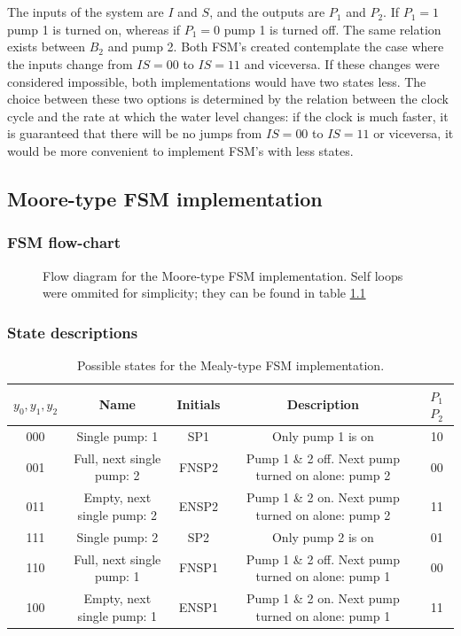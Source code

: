 \documentclass[../../e3_tp3_main.tex]{subfiles}
\begin{document}
\chapter{}

The inputs of the system are $I$ and $S$, and the outputs are $P_1$ and $P_2$. If $P_1=1$ pump 1 is turned on, whereas if $P_1=0$ pump 1 is turned off. The same relation exists between $B_2$ and pump 2. Both FSM's created contemplate the case where the inputs change from $IS=00$ to $IS=11$ and viceversa. If these changes were considered impossible, both implementations would have two states less. The choice between these two options is determined by the relation between the clock cycle and the rate at which the water level changes: if the clock is much faster, it is guaranteed that there will be no jumps from $IS=00$ to $IS=11$ or viceversa, it would be more convenient to implement FSM's with less states.

\section{Moore-type FSM implementation}
\subsection{FSM flow-chart}
\begin{figure}[H]
	\centering
	
	\caption{Flow diagram for the Moore-type FSM implementation. Self loops were ommited for simplicity; they can be found in table \ref{tab:ej1_moore_states}}
\end{figure}

\subsection{State descriptions}
\begin{table}[H]	%
	\centering
	\begin{tabular}{|c|c|c|c|c|}
	\hline	
	$y_0, y_1, y_2$ & Name & Initials & Description & $P_1$ $P_2$\\	
	\hline 
	000 & Single pump: 1 &SP1& Only pump 1 is on & 10\\ 
	\hline 
	001 & Full, next single pump: 2 &FNSP2 & Pump 1 \& 2 off. Next pump turned on alone: pump 2& 00\\ 
	\hline	
	011 & Empty, next single pump: 2 &ENSP2 & Pump 1 \& 2 on. Next pump turned on alone: pump 2 & 11\\ 
	\hline 
	111 & Single pump: 2 & SP2 & Only pump 2 is on & 01\\ 
	\hline 
	110 & Full, next single pump: 1 &FNSP1& Pump 1 \& 2 off. Next pump turned on alone: pump 1 & 00\\ 
	\hline	
	100 & Empty, next single pump: 1 &ENSP1& Pump 1 \& 2 on. Next pump turned on alone: pump 1 & 11\\ 
	\hline 
	\end{tabular} 
	\caption{Possible states for the Mealy-type FSM implementation.}
	\label{tab:ej1_moore_states}
\end{table}
\end{document}
